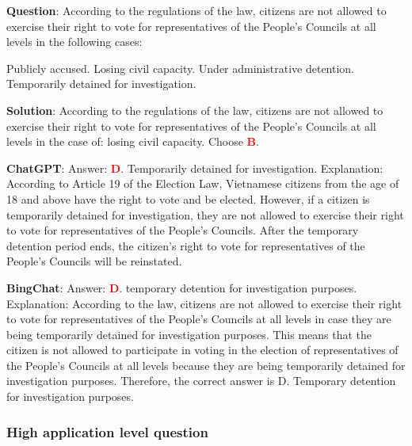 \documentclass{article}
\begin{document}
{	
	
	\begin{mdframed}[linewidth=1pt,linecolor=red] \textbf{Question}: According to the regulations of the law, citizens are not allowed to exercise their right to vote for representatives of the People's Councils at all levels in the following cases: 
		
		\begin{choices}
			\choice Publicly accused.
			\choice Losing civil capacity.
			\choice Under administrative detention.
			\choice Temporarily detained for investigation.
		\end{choices}
		
		\textbf{Solution}: According to the regulations of the law, citizens are not allowed to exercise their right to vote for representatives of the People's Councils at all levels in the case of: losing civil capacity. Choose \textcolor{red}{\textbf{B}}.
		
		\textbf{ChatGPT}: Answer: \textcolor{red}{\textbf{D}}. Temporarily detained for investigation. Explanation: According to Article 19 of the Election Law, Vietnamese citizens from the age of 18 and above have the right to vote and be elected. However, if a citizen is temporarily detained for investigation, they are not allowed to exercise their right to vote for representatives of the People's Councils. After the temporary detention period ends, the citizen's right to vote for representatives of the People's Councils will be reinstated.
		
		\textbf{BingChat}: Answer: \textcolor{red}{\textbf{D}}. temporary detention for investigation purposes. Explanation: According to the law, citizens are not allowed to exercise their right to vote for representatives of the People’s Councils at all levels in case they are being temporarily detained for investigation purposes. This means that the citizen is not allowed to participate in voting in the election of representatives of the People’s Councils at all levels because they are being temporarily detained for investigation purposes. Therefore, the correct answer is D. Temporary detention for investigation purposes.
		
	\end{mdframed}	
	
	\subsubsection{High application level question}
	\label{VNHSGE_Civ_H}
	
}
\end{document}
